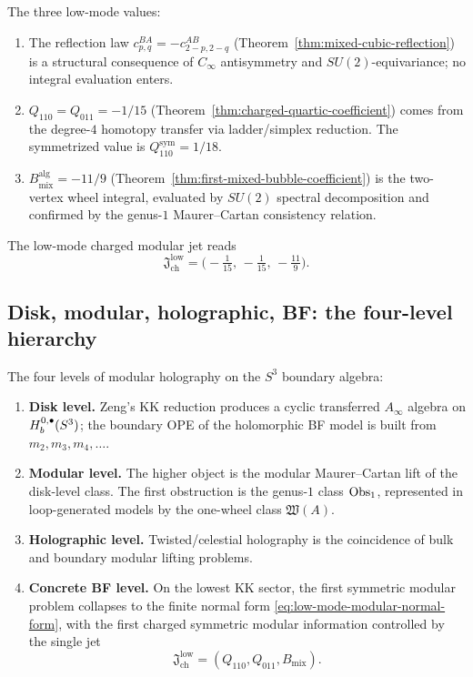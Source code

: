 \begin{remark}
\label{rem:summary-derivation}
The three low-mode values:
\begin{enumerate}[label=\textup{(\roman*)},leftmargin=2em]
\item The reflection law $c^{BA}_{p,q}=-c^{AB}_{2-p,2-q}$
 (Theorem~\ref{thm:mixed-cubic-reflection}) is a structural
 consequence of $C_\infty$ antisymmetry and $SU(2)$-equivariance;
 no integral evaluation enters.
\item $Q_{110}=Q_{011}=-1/15$
 (Theorem~\ref{thm:charged-quartic-coefficient}) comes from the
 degree-$4$ homotopy transfer via ladder/simplex reduction. The
 symmetrized value is $Q_{110}^{\mathrm{sym}}=1/18$.
\item $B_{\mathrm{mix}}^{\mathrm{alg}}=-11/9$
 (Theorem~\ref{thm:first-mixed-bubble-coefficient}) is the
 two-vertex wheel integral, evaluated by $SU(2)$ spectral
 decomposition and confirmed by the genus-$1$ Maurer--Cartan
 consistency relation.
\end{enumerate}
The low-mode charged modular jet reads
\[
\mathfrak J_{\mathrm{ch}}^{\mathrm{low}}
=\bigl(-\tfrac{1}{15},\,-\tfrac{1}{15},\,-\tfrac{11}{9}\bigr).
\]
\end{remark}

\subsection{Disk, modular, holographic, BF: the four-level hierarchy}
\label{subsec:distilled-picture}

The four levels of modular holography on the $S^3$ boundary algebra:

\begin{enumerate}[label=\textup{(\arabic*)}]
\item \textbf{Disk level.}
Zeng's KK reduction produces a cyclic transferred $A_\infty$
algebra on $H_b^{0,\bullet}(S^3)$; the boundary OPE of the holomorphic BF model is
built from $m_2,m_3,m_4,\dots$.

\item \textbf{Modular level.}
The higher object is the modular Maurer--Cartan lift of the
disk-level class. The first obstruction is the genus-$1$ class
$\operatorname{Obs}_1$, represented in loop-generated models by the one-wheel
class $\mathfrak W(A)$.

\item \textbf{Holographic level.}
Twisted/celestial holography is the coincidence of bulk and
boundary modular lifting problems.

\item \textbf{Concrete BF level.}
On the lowest KK sector, the first symmetric modular problem
collapses to the finite normal form
\eqref{eq:low-mode-modular-normal-form}, with the first charged
symmetric modular information controlled by the single jet
\[
\mathfrak J_{\mathrm{ch}}^{\mathrm{low}}=(Q_{110},Q_{011},B_{\mathrm{mix}}).
\]
\end{enumerate}

